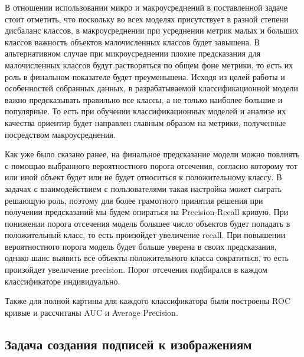 \documentclass[a4paper,12pt]{extarticle}
\begin{document}
В отношении использовании микро и макроусреднений в поставленной задаче стоит отметить, что поскольку во всех моделях присутствует в разной степени дисбаланс классов, в макроусреднении при усреднении метрик малых и больших классов важность объектов малочисленных классов будет завышена. В альтернативном случае при микроусреднении плохие предсказания для малочисленных классов будут растворяться по общем фоне метрики, то есть их роль в финальном показателе будет преуменьшена. Исходя из целей работы и особенностей собранных данных, в разрабатываемой классификационной модели важно предсказывать правильно все классы, а не только наиболее большие и популярные. То есть при обучении классификационных моделей и анализе их качества ориентир будет направлен главным образом на метрики, полученные посредством макроусреднения.

Как уже было сказано ранее, на финальное предсказание модели можно повлиять с помощью выбранного вероятностного порога отсечения, согласно которому тот или иной объект будет или не будет относиться к положительному классу. В задачах с взаимодействием с пользователями такая настройка может сыграть решающую роль, поэтому для более грамотного принятия решения при получении предсказаний мы будем опираться на Precision-Recall кривую. При понижении порога отсечения модель большее число объектов будет попадать в положительный класс, то есть произойдет увеличение recall. При повышении вероятностного порога модель будет больше уверена в своих предсказания, однако шанс выявить все объекты положительного класса сократиться, то есть произойдет увеличение precision. Порог отсечения подбирался в каждом классификаторе индивидуально.

Также для полной картины для каждого классификатора были построены ROC кривые и рассчитаны AUC и Average Preсision.





















\subsection{Задача создания подписей к изображениям}\label{subsection:image-captioning}
\end{document}
